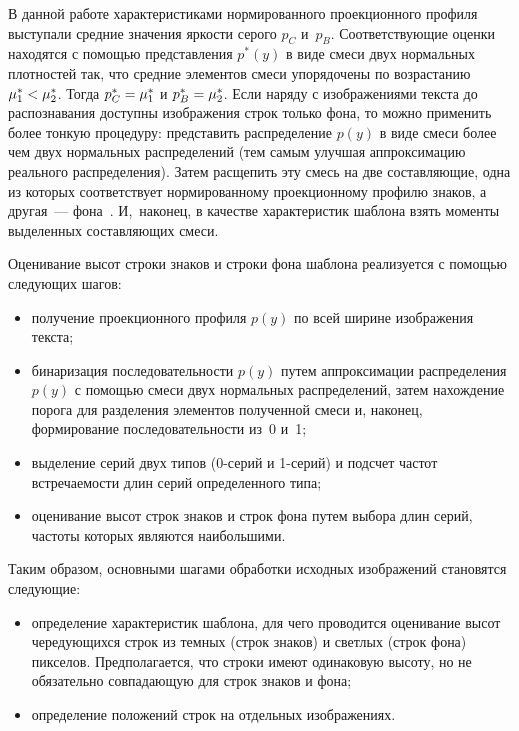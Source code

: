 \begin{multicols}{2}
      В данной работе характеристиками нормированного проекционного профиля 
выступали средние значения яркости серого $p_C$ и~$p_B$. Соответствующие оценки 
находятся с помощью представления $p^*(y)$ в виде смеси двух нормальных плотностей 
так, что средние элементов смеси упорядочены по возрастанию $\mu_1^*\hm<\mu_2^*$. 
Тогда $p_C^*\hm=\mu_1^*$ и $p_B^*\hm=\mu_2^*$. Если наряду с изображениями текста 
до распознавания доступны изображения строк только фона, то можно применить более 
тонкую процедуру: представить распределение $p(y)$ в виде смеси более чем двух 
нормальных распределений (тем самым улучшая аппроксимацию реального 
распределения). Затем расщепить эту смесь на две составляющие, одна из которых 
соответствует нормированному проекционному профилю знаков, а другая~--- 
фона~\cite{9-kr}. И,~наконец, в качестве характеристик шаблона взять моменты 
выделенных составляющих смеси.


      
      Оценивание высот строки знаков и строки фона шаблона реализуется с помощью 
следующих шагов:
      \begin{itemize}
\item получение проекционного профиля $p(y)$ по всей ширине изображения текста;
\item бинаризация последовательности $p(y)$ путем аппроксимации распределения 
$p(y)$ с помощью смеси двух нормальных распределений, затем нахождение порога 
для разделения элементов полученной смеси и, наконец, формирование 
последовательности из~0 и~1;
\item выделение серий двух типов (0-сер\-ий и 1-се\-рий) и подсчет частот 
встречаемости длин серий определенного типа;
\item оценивание высот строк знаков и строк фона путем выбора длин серий, частоты 
которых являются наибольшими.
\end{itemize}

      Таким образом, основными шагами обработки исходных изображений становятся 
следующие:
      \begin{itemize}
\item определение характеристик шаблона, для чего проводится оценивание высот 
чередующихся строк из темных (строк знаков) и светлых (строк фона) пикселов. 
Предполагается, что строки имеют одинаковую высоту, но не обязательно 
совпадающую для строк знаков и фона;
\item определение положений строк на отдельных изображениях.
\end{itemize}


\end{multicols}

